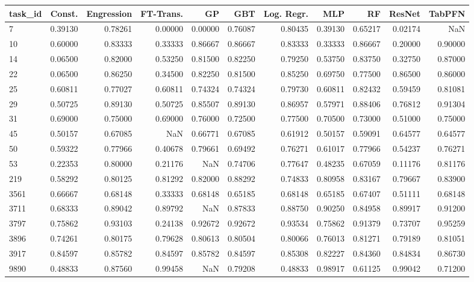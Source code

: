 \begin{tabular}{lrrrrrrrrrr}
\toprule
task\_id & Const. & Engression & FT-Trans. & GP & GBT & Log. Regr. & MLP & RF & ResNet & TabPFN \\
\midrule
7 & 0.39130 & 0.78261 & 0.00000 & 0.00000 & 0.76087 & 0.80435 & 0.39130 & 0.65217 & 0.02174 & NaN \\
10 & 0.60000 & 0.83333 & 0.33333 & 0.86667 & 0.86667 & 0.83333 & 0.33333 & 0.86667 & 0.20000 & 0.90000 \\
14 & 0.06500 & 0.82000 & 0.53250 & 0.81500 & 0.82250 & 0.79250 & 0.53750 & 0.83750 & 0.32750 & 0.87000 \\
22 & 0.06500 & 0.86250 & 0.34500 & 0.82250 & 0.81500 & 0.85250 & 0.69750 & 0.77500 & 0.86500 & 0.86000 \\
25 & 0.60811 & 0.77027 & 0.60811 & 0.74324 & 0.74324 & 0.79730 & 0.60811 & 0.82432 & 0.59459 & 0.81081 \\
29 & 0.50725 & 0.89130 & 0.50725 & 0.85507 & 0.89130 & 0.86957 & 0.57971 & 0.88406 & 0.76812 & 0.91304 \\
31 & 0.69000 & 0.75000 & 0.69000 & 0.76000 & 0.72500 & 0.77500 & 0.70500 & 0.73000 & 0.51000 & 0.75000 \\
45 & 0.50157 & 0.67085 & NaN & 0.66771 & 0.67085 & 0.61912 & 0.50157 & 0.59091 & 0.64577 & 0.64577 \\
50 & 0.59322 & 0.77966 & 0.40678 & 0.79661 & 0.69492 & 0.76271 & 0.61017 & 0.77966 & 0.54237 & 0.76271 \\
53 & 0.22353 & 0.80000 & 0.21176 & NaN & 0.74706 & 0.77647 & 0.48235 & 0.67059 & 0.11176 & 0.81176 \\
219 & 0.58292 & 0.80125 & 0.81292 & 0.82000 & 0.88292 & 0.74833 & 0.80958 & 0.83167 & 0.79667 & 0.83900 \\
3561 & 0.66667 & 0.68148 & 0.33333 & 0.68148 & 0.65185 & 0.68148 & 0.65185 & 0.67407 & 0.51111 & 0.68148 \\
3711 & 0.68333 & 0.89042 & 0.89792 & NaN & 0.87833 & 0.88750 & 0.90250 & 0.84958 & 0.89917 & 0.91200 \\
3797 & 0.75862 & 0.93103 & 0.24138 & 0.92672 & 0.92672 & 0.93534 & 0.75862 & 0.91379 & 0.73707 & 0.95259 \\
3896 & 0.74261 & 0.80175 & 0.79628 & 0.80613 & 0.80504 & 0.80066 & 0.76013 & 0.81271 & 0.79189 & 0.81051 \\
3917 & 0.84597 & 0.85782 & 0.84597 & 0.85782 & 0.84597 & 0.85308 & 0.82227 & 0.84360 & 0.84834 & 0.86730 \\
9890 & 0.48833 & 0.87560 & 0.99458 & NaN & 0.79208 & 0.48833 & 0.98917 & 0.61125 & 0.99042 & 0.71200 \\

\end{tabular}

